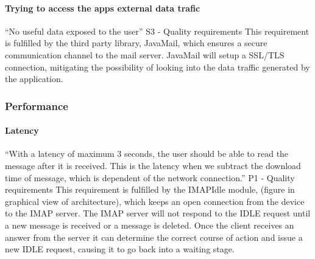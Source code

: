 \paragraph{Trying to access the apps external data trafic}
“No useful data exposed to the user” S3 - Quality requirements
\newline
\newline
This requirement is fulfilled by the third party library, JavaMail, which ensures a secure communication channel to the mail server. JavaMail  will setup a SSL/TLS connection, mitigating the possibility of looking into the data traffic generated by the application.

\subsubsection{Performance}

\paragraph{Latency}
“With a latency of maximum 3 seconds, the user should be able to read the message after it is received. This is the latency when we subtract the download time of message, which is dependent of the network connection.” P1 - Quality requirements
\newline
\newline
This requirement is fulfilled by the IMAPIdle module, (figure in graphical view of architecture), which keeps an open connection from the device to the IMAP server. The IMAP server will not respond to the IDLE request until a new message is received or a message is deleted. Once the client receives an answer from the server it can determine the correct course of action and issue a new IDLE request, causing it to go back into a waiting stage. 